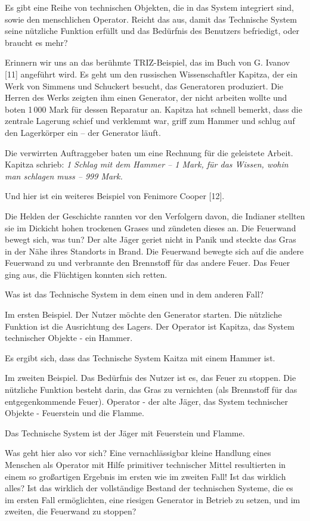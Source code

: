 \documentclass[11pt,a4paper]{article}
\begin{document}
Es gibt eine Reihe von technischen Objekten, die in das System integriert
sind, sowie den menschlichen Operator. Reicht das aus, damit das Technische
System seine nützliche Funktion erfüllt und das Bedürfnis des Benutzers
befriedigt, oder braucht es mehr?

Erinnern wir uns an das berühmte TRIZ-Beispiel, das im Buch von G. Ivanov [11]
angeführt wird. Es geht um den russischen Wissenschaftler Kapitza, der ein
Werk von Simmens und Schuckert besucht, das Generatoren produziert. Die Herren
des Werks zeigten ihm einen Generator, der nicht arbeiten wollte und boten
1\,000 Mark für dessen Reparatur an. Kapitza hat schnell bemerkt, dass die
zentrale Lagerung schief und verklemmt war, griff zum Hammer und schlug auf
den Lagerkörper ein -- der Generator läuft.

Die verwirrten Auftraggeber baten um eine Rechnung für die geleistete Arbeit.
Kapitza schrieb: \emph{1 Schlag mit dem Hammer -- 1 Mark, für das Wissen,
  wohin man schlagen muss -- 999 Mark.}

Und hier ist ein weiteres Beispiel von Fenimore Cooper [12].

Die Helden der Geschichte rannten vor den Verfolgern davon, die Indianer
stellten sie im Dickicht hohen trockenen Grases und zündeten dieses an.  Die
Feuerwand bewegt sich, was tun? Der alte Jäger geriet nicht in Panik und
steckte das Gras in der Nähe ihres Standorts in Brand. Die Feuerwand bewegte
sich auf die andere Feuerwand zu und verbrannte den Brennstoff für das andere
Feuer.  Das Feuer ging aus, die Flüchtigen konnten sich retten.

Was ist das Technische System in dem einen und in dem anderen Fall?

Im ersten Beispiel. Der Nutzer möchte den Generator starten.  Die nützliche
Funktion ist die Ausrichtung des Lagers. Der Operator ist Kapitza, das System
technischer Objekte - ein Hammer.

Es ergibt sich, dass das Technische System Kaitza mit einem Hammer ist.

Im zweiten Beispiel. Das Bedürfnis des Nutzer ist es, das Feuer zu stoppen.
Die nützliche Funktion besteht darin, das Gras zu vernichten (als Brennstoff
für das entgegenkommende Feuer). Operator - der alte Jäger, das System 
technischer Objekte - Feuerstein und die Flamme.

Das Technische System ist der Jäger mit Feuerstein und Flamme.

Was geht hier also vor sich? Eine vernachlässigbar kleine Handlung eines
Menschen als Operator mit Hilfe primitiver technischer Mittel resultierten in
einem so großartigen Ergebnis im ersten wie im zweiten Fall! Ist das wirklich
alles?  Ist das wirklich der vollständige Bestand der technischen Systeme, die
es im ersten Fall ermöglichten, eine riesigen Generator in Betrieb zu setzen,
und im zweiten, die Feuerwand zu stoppen?
\end{document}
